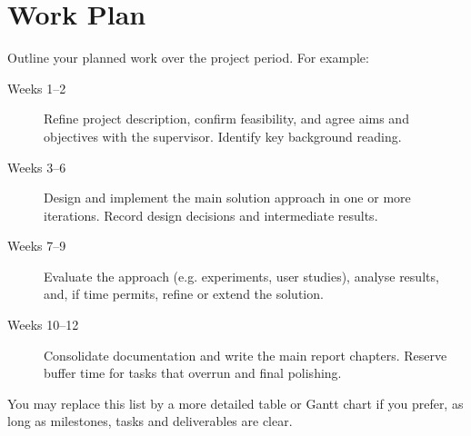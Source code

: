 \documentclass[sans,oneside,single,parskip,raggedright,numeric]{qproposal}
\begin{document}
\section{Work Plan}

Outline your planned work over the project period. For example:

\begin{description}
  \item[Weeks 1--2] Refine project description, confirm feasibility, and agree
    aims and objectives with the supervisor. Identify key background reading.
  \item[Weeks 3--6] Design and implement the main solution approach in one or
    more iterations. Record design decisions and intermediate results.
  \item[Weeks 7--9] Evaluate the approach (e.g. experiments, user studies),
    analyse results, and, if time permits, refine or extend the solution.
  \item[Weeks 10--12] Consolidate documentation and write the main report
    chapters. Reserve buffer time for tasks that overrun and final polishing.
\end{description}

You may replace this list by a more detailed table or Gantt chart if you
prefer, as long as milestones, tasks and deliverables are clear.

%

\end{document}
